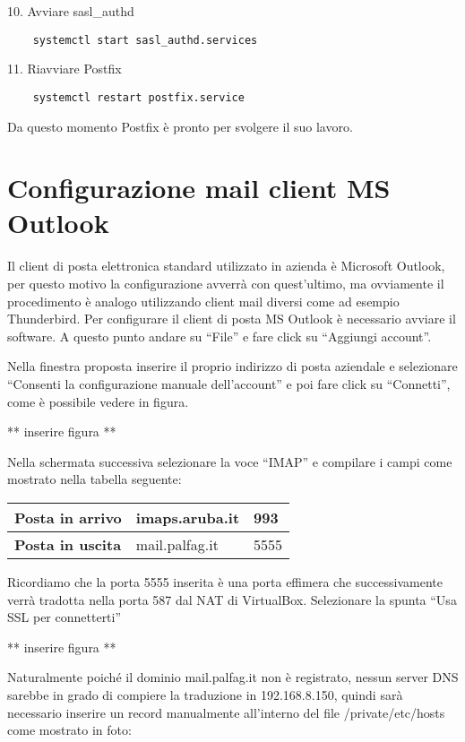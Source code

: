10. Avviare sasl\_authd
\begin{verbatim}
    systemctl start sasl_authd.services
\end{verbatim}

11. Riavviare Postfix
\begin{verbatim}
    systemctl restart postfix.service
\end{verbatim}

Da questo momento Postfix è pronto per svolgere il suo lavoro.

\pagebreak
\section{Configurazione mail client MS Outlook}
Il client di posta elettronica standard utilizzato in azienda è Microsoft Outlook, 
per questo motivo la configurazione avverrà con quest'ultimo, 
ma ovviamente il procedimento è analogo utilizzando client mail diversi come ad esempio Thunderbird.
Per configurare il client di posta MS Outlook è necessario avviare il software.
A questo punto andare su ``File'' e fare click su ``Aggiungi account''.

Nella finestra proposta inserire il proprio indirizzo di posta aziendale e selezionare ``Consenti la configurazione
manuale dell'account'' e poi fare click su ``Connetti'', come è possibile vedere in figura.

** inserire figura ** 

Nella schermata successiva selezionare la voce ``IMAP'' e compilare i campi come mostrato nella tabella seguente:


\begin{table}[htp]
    \centering
    \begin{tabular}{|l|l|l|}
    \hline
    \rowcolor[HTML]{EFEFEF} 
    \textbf{Posta in arrivo} & imaps.aruba.it & 993  \\ \hline
    \textbf{Posta in uscita} & mail.palfag.it & 5555 \\ \hline
    \end{tabular}%
    \end{table}

    Ricordiamo che la porta 5555 inserita è una porta effimera che successivamente verrà tradotta nella porta 587
    dal NAT di VirtualBox.
    Selezionare la spunta ``Usa SSL per connetterti''

    ** inserire figura ** 

    Naturalmente poiché il dominio mail.palfag.it non è registrato, 
    nessun server DNS sarebbe in grado di compiere la traduzione in 192.168.8.150, 
    quindi sarà necessario inserire un record manualmente all’interno del file /private/etc/hosts 
    come mostrato in foto:

